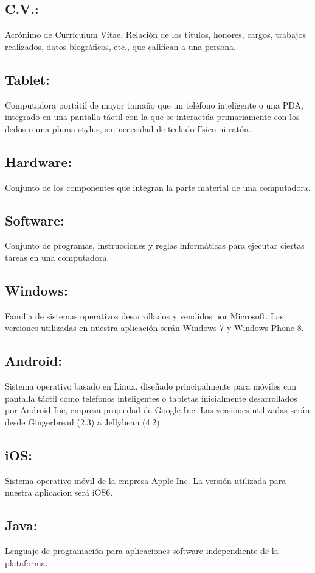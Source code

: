 \documentclass[spanish,a4paper,12pt]{report}	%
\begin{document}
\subsection{C.V.:}Acrónimo de Currículum Vítae. Relación de los títulos, honores, cargos, trabajos realizados, datos biográficos, etc., que califican a una persona.
\subsection{Tablet:} Computadora portátil de mayor tamaño que un teléfono inteligente o una PDA, integrado en una pantalla táctil con la que se interactúa primariamente con los dedos o una pluma stylus, sin necesidad de teclado físico ni ratón.
\subsection{Hardware:} Conjunto de los componentes que integran la parte material de una computadora.
\subsection{Software:} Conjunto de programas, instrucciones y reglas informáticas para ejecutar ciertas tareas en una computadora.
\subsection{Windows:}Familia de sistemas operativos desarrollados y vendidos por Microsoft. Las versiones utilizadas en nuestra aplicación serán Windows 7 y Windows Phone 8.
\subsection{Android:} Sistema operativo basado en Linux, diseñado principalmente para móviles con pantalla táctil como teléfonos inteligentes o tabletas inicialmente desarrollados por Android Inc, empresa propiedad de Google Inc. Las versiones utilizadas serán desde Gingerbread (2.3) a Jellybean (4.2).
\subsection{iOS:} Sistema operativo móvil de la empresa Apple Inc. La versión utilizada para nuestra aplicacion será iOS6.
\subsection{Java:} Lenguaje de programación para aplicaciones software independiente de la plataforma.
\end{document}
